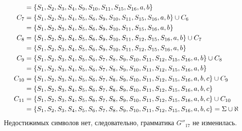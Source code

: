 \begin{itemize}
\begin{align*}
		             & = \left\{S_1, S_2, S_3, S_4, S_9, S_{10}, S_{11}, S_{15}, S_{16}, a, b\right\}                                                     \\
		      C_{7}  & = \left\{S_1, S_2, S_3, S_4, S_5, S_6, S_9, S_{10}, S_{11}, S_{15}, S_{16}, a, b\right\} \cup C_{6}                                \\
		             & = \left\{S_1, S_2, S_3, S_4, S_5, S_6, S_9, S_{10}, S_{11}, S_{15}, S_{16}, a, b\right\}                                           \\
		      C_{8}  & = \left\{S_1, S_2, S_3, S_4, S_5, S_6, S_9, S_{10}, S_{11}, S_{12}, S_{15}, S_{16}, a, b\right\} \cup C_{7}                        \\
		             & = \left\{S_1, S_2, S_3, S_4, S_5, S_6, S_9, S_{10}, S_{11}, S_{12}, S_{15}, S_{16}, a, b\right\}                                   \\
		      C_{9}  & = \left\{S_1, S_2, S_3, S_4, S_5, S_6, S_7, S_8, S_9, S_{10}, S_{11}, S_{12}, S_{15}, S_{16}, a, b\right\} \cup C_{8}              \\
		             & = \left\{S_1, S_2, S_3, S_4, S_5, S_6, S_7, S_8, S_9, S_{10}, S_{11}, S_{12}, S_{15}, S_{16}, a, b\right\}                         \\
		      C_{10} & = \left\{S_1, S_2, S_3, S_4, S_5, S_6, S_7, S_8, S_9, S_{10}, S_{11}, S_{12}, S_{15}, S_{16}, a, b, c\right\} \cup C_{9}           \\
		             & = \left\{S_1, S_2, S_3, S_4, S_5, S_6, S_7, S_8, S_9, S_{10}, S_{11}, S_{12}, S_{15}, S_{16}, a, b, c\right\}                      \\
		      C_{11} & = \left\{S_1, S_2, S_3, S_4, S_5, S_6, S_7, S_8, S_9, S_{10}, S_{11}, S_{12}, S_{15}, S_{16}, a, b, c\right\} \cup C_{10}          \\
		             & = \left\{S_1, S_2, S_3, S_4, S_5, S_6, S_7, S_8, S_9, S_{10}, S_{11}, S_{12}, S_{15}, S_{16}, a, b, c\right\} = \Sigma \cup \aleph
	      \end{align*}
	      Недостижимых символов нет, следовательно, грамматика \(G''_{17}\) не изменилась.
\end{itemize}
